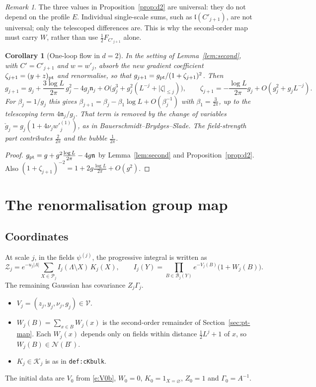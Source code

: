 \documentclass[11pt]{amsart}
\newtheorem{corollary}[theorem]{Corollary}
\theoremstyle{definition}
\theoremstyle{remark}
\newtheorem{remark}[theorem]{Remark}
\numberwithin{equation}{section}
\newcommand{\cB}{\mathcal{B}}
\newcommand{\cP}{\mathcal{P}}
\newcommand{\cV}{\mathcal{V}}
\newcommand{\cZ}{\mathcal{Z}}
\newcommand{\cN}{\mathcal{N}}
\begin{document}
\begin{remark}
The three values in Proposition~\ref{prop:d2} are universal: they do not depend on the profile
$E$. Individual single-scale sums, such as $\mathfrak l(C'_{j+1})$, are not universal; only
the telescoped differences are. This is why the second-order map must carry $W$,
rather than use $\frac12F_{C'_{j+1}}$ alone.
\end{remark}

\begin{corollary}[One-loop flow in $d=2$]\label{cor:oneloop}
In the setting of Lemma~\ref{lem:second}, with $C'=C'_{j+1}$ and $w=w'_j$, absorb the new
gradient coefficient $\zeta_{j+1}=(y+z)_{\rm pt}$ and renormalise, so that
$g_{j+1}=g_{\rm pt}/(1+\zeta_{j+1})^2$. Then
\[
  g_{j+1}=g_j+\frac{3\log L}{2\pi}\,g_j^2-4g_j\mathfrak n_j+O\bigl(g_j^3+g_j^2(L^{-j}+|\zeta|_{\le j})\bigr),
  \qquad \zeta_{j+1}=-\frac{\log L}{2\pi}g_j+O(g_j^2+g_jL^{-j}).
\]
For $\beta_j=1/g_j$ this gives $\beta_{j+1}=\beta_j-\beta_1\log L+O(\beta_j^{-1})$ with
$\beta_1=\frac3{2\pi}$, up to the telescoping term $4\mathfrak n_j/g_j$. That term is removed by
the change of variables $\check g_j=g_j(1+4\nu_jw'^{(1)}_j)$, as in
Bauerschmidt--Brydges--Slade. The field-strength part contributes $\frac2{2\pi}$ and the bubble
$\frac1{2\pi}$.
\end{corollary}

\begin{proof}
$g_{\rm pt}=g+g^2\frac{\log L}{2\pi}-4g\mathfrak n$ by Lemma~\ref{lem:second} and
Proposition~\ref{prop:d2}. Also $(1+\zeta_{j+1})^{-2}=1+2g\frac{\log L}{2\pi}+O(g^2)$.
\end{proof}

\section{The renormalisation group map}
\label{sec:rgmap}

\subsection{Coordinates}
At scale $j$, in the fields $\psi^{(j)}$, the progressive integral is written as
\begin{equation}\label{e:coords}
  \cZ_j=e^{-u_j|\Lambda|}\sum_{X\in\cP_j}I_j(\Lambda\setminus X)\,K_j(X),\qquad
  I_j(Y)=\prod_{B\in\cB_j(Y)}e^{-V_j(B)}\bigl(1+W_j(B)\bigr).
\end{equation}
The remaining Gaussian has covariance $Z_j\Gamma_j$.
\begin{itemize}
\item $V_j=(z_j,y_j,\nu_j,g_j)\in\cV$.
\item $W_j(B)=\sum_{x\in B}W_j(x)$ is the second-order remainder of Section~\ref{sec:pt-map}. Each
  $W_j(x)$ depends only on fields within distance $\frac12L^j+1$ of $x$, so
  $W_j(B)\in\cN(B^\square)$.
\item $K_j\in\mathcal K_j$ is as in \texttt{def:cKbulk}.
\end{itemize}
The initial data are $V_0$ from \eqref{e:V0b}, $W_0=0$, $K_0=1_{X=\varnothing}$, $Z_0=1$ and
$\Gamma_0=A^{-1}$.
\end{document}
